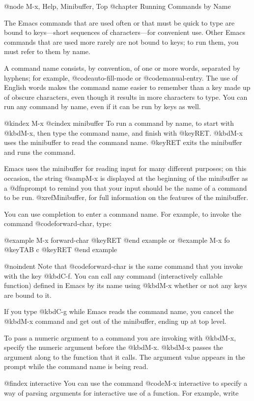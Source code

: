 {{@node M-x, Help, Minibuffer, Top
@chapter Running Commands by Name

  The Emacs commands that are used often or that must be quick to type are
bound to keys---short sequences of characters---for convenient use.  Other
Emacs commands that are used more rarely are not bound to keys; to run
them, you must refer to them by name.

  A command name consists, by convention, of one or more words,
separated by hyphens; for example, @code{auto-fill-mode} or
@code{manual-entry}.  The use of English words makes the command name
easier to remember than a key made up of obscure characters, even though
it results in more characters to type.  You can run any command by name,
even if it can be run by keys as well. 

@kindex M-x
@cindex minibuffer
 To run a command by name, to start with @kbd{M-x}, then type the
command name, and finish with @key{RET}.  @kbd{M-x} uses the minibuffer
to read the command name.  @key{RET} exits the minibuffer and runs the
command.

  Emacs uses the minibuffer for reading input for many different purposes;
on this occasion, the string @samp{M-x} is displayed at the beginning of
the minibuffer as a @dfn{prompt} to remind you that your input should be
the name of a command to be run.  @xref{Minibuffer}, for full information
on the features of the minibuffer.

  You can use completion to enter a command name.  For example, to
invoke the command @code{forward-char}, type:

@example
M-x forward-char @key{RET}
@end example
or
@example
M-x fo @key{TAB} c @key{RET}
@end example

@noindent
Note that @code{forward-char} is the same command that you invoke with
the key @kbd{C-f}.  You can call any command (interactively callable
function) defined in Emacs by its name using @kbd{M-x} whether or not
any keys are bound to it.

  If you type @kbd{C-g} while Emacs reads the command name, you cancel
the @kbd{M-x} command and get out of the minibuffer, ending up at top level.

  To pass a numeric argument to a command you are invoking with
@kbd{M-x}, specify the numeric argument before the @kbd{M-x}.  @kbd{M-x}
passes the argument along to the function that it calls.  The argument
value appears in the prompt while the command name is being read.

@findex interactive
You can use the command @code{M-x interactive} to specify a way of
parsing arguments for interactive use of a function.  For example, write

}}
